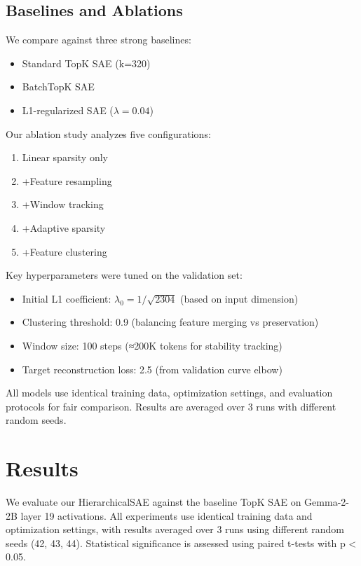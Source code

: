 \documentclass{article} %
\begin{document}
\subsection{Baselines and Ablations}
We compare against three strong baselines:
\begin{itemize}
    \item Standard TopK SAE (k=320)
    \item BatchTopK SAE \cite{bussmannBatchTopKSparseAutoencoders2024}
    \item L1-regularized SAE ($\lambda=0.04$)
\end{itemize}

Our ablation study analyzes five configurations:
\begin{enumerate}
    \item Linear sparsity only
    \item +Feature resampling
    \item +Window tracking
    \item +Adaptive sparsity
    \item +Feature clustering
\end{enumerate}

Key hyperparameters were tuned on the validation set:
\begin{itemize}
    \item Initial L1 coefficient: $\lambda_0 = 1/\sqrt{2304}$ (based on input dimension)
    \item Clustering threshold: 0.9 (balancing feature merging vs preservation)
    \item Window size: 100 steps (≈200K tokens for stability tracking)
    \item Target reconstruction loss: 2.5 (from validation curve elbow)
\end{itemize}

All models use identical training data, optimization settings, and evaluation protocols for fair comparison. Results are averaged over 3 runs with different random seeds.

\section{Results}
\label{sec:results}

We evaluate our HierarchicalSAE against the baseline TopK SAE on Gemma-2-2B layer 19 activations. All experiments use identical training data and optimization settings, with results averaged over 3 runs using different random seeds (42, 43, 44). Statistical significance is assessed using paired t-tests with p < 0.05.
\end{document}
